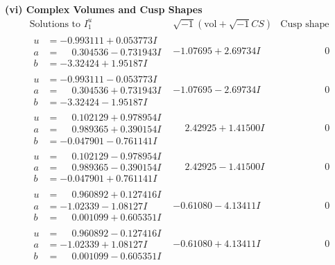 \documentclass[1p]{elsarticle_modified}
\theoremstyle{definition}
\newcommand{\I}{\sqrt{-1}}
\begin{document}
\newpage\flushleft \textbf{(vi) Complex Volumes and Cusp Shapes}
$$\begin{array}{c|c|c}  
\text{Solutions to }I^u_{1}& \I (\text{vol} + \sqrt{-1}CS) & \text{Cusp shape}\\
 \hline 
\begin{aligned}
u &= -0.993111 + 0.053773 I \\
a &= \phantom{-}0.304536 - 0.731943 I \\
b &= -3.32424 + 1.95187 I\end{aligned}
 & -1.07695 + 2.69734 I & \phantom{-0.000000 } 0 \\ \hline\begin{aligned}
u &= -0.993111 - 0.053773 I \\
a &= \phantom{-}0.304536 + 0.731943 I \\
b &= -3.32424 - 1.95187 I\end{aligned}
 & -1.07695 - 2.69734 I & \phantom{-0.000000 } 0 \\ \hline\begin{aligned}
u &= \phantom{-}0.102129 + 0.978954 I \\
a &= \phantom{-}0.989365 + 0.390154 I \\
b &= -0.047901 - 0.761141 I\end{aligned}
 & \phantom{-}2.42925 + 1.41500 I & \phantom{-0.000000 } 0 \\ \hline\begin{aligned}
u &= \phantom{-}0.102129 - 0.978954 I \\
a &= \phantom{-}0.989365 - 0.390154 I \\
b &= -0.047901 + 0.761141 I\end{aligned}
 & \phantom{-}2.42925 - 1.41500 I & \phantom{-0.000000 } 0 \\ \hline\begin{aligned}
u &= \phantom{-}0.960892 + 0.127416 I \\
a &= -1.02339 - 1.08127 I \\
b &= \phantom{-}0.001099 + 0.605351 I\end{aligned}
 & -0.61080 - 4.13411 I & \phantom{-0.000000 } 0 \\ \hline\begin{aligned}
u &= \phantom{-}0.960892 - 0.127416 I \\
a &= -1.02339 + 1.08127 I \\
b &= \phantom{-}0.001099 - 0.605351 I\end{aligned}
 & -0.61080 + 4.13411 I & \phantom{-0.000000 } 0 \\ \hline\begin{aligned}

\end{aligned}
\end{array}$$
\end{document}
